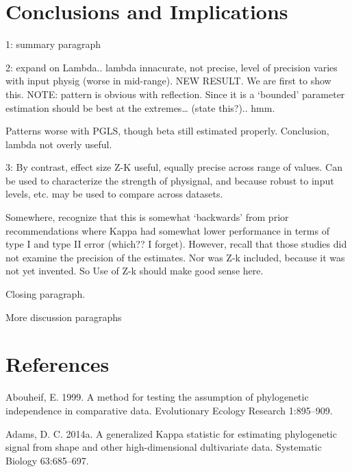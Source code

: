 \documentclass[
]{article}
\begin{document}
\hypertarget{conclusions-and-implications}{%
\section{Conclusions and
Implications}\label{conclusions-and-implications}}

1: summary paragraph

2: expand on Lambda.. lambda innacurate, not precise, level of precision
varies with input physig (worse in mid-range). NEW RESULT. We are first
to show this. NOTE: pattern is obvious with reflection. Since it is a
`bounded' parameter estimation should be best at the extremes\ldots{}
(state this?).. hmm.

Patterns worse with PGLS, though beta still estimated properly.
Conclusion, lambda not overly useful.

3: By contrast, effect size Z-K useful, equally precise across range of
values. Can be used to characterize the strength of physignal, and
because robust to input levels, etc. may be used to compare across
datasets.

Somewhere, recognize that this is somewhat `backwards' from prior
recommendations where Kappa had somewhat lower performance in terms of
type I and type II error (which?? I forget). However, recall that those
studies did not examine the precision of the estimates. Nor was Z-k
included, because it was not yet invented. So Use of Z-k should make
good sense here.

Closing paragraph.

\hfill\break

More discussion paragraphs

\newpage

\hypertarget{references}{%
\section{References}\label{references}}

\setlength{\parindent}{-0.25in} \setlength{\leftskip}{0.25in}
\setlength{\parskip}{8pt} \noindent

\hypertarget{refs}{}
\leavevmode\hypertarget{ref-Abouheif1999}{}%
Abouheif, E. 1999. A method for testing the assumption of phylogenetic
independence in comparative data. Evolutionary Ecology Research
1:895--909.

\leavevmode\hypertarget{ref-Adams2014a}{}%
Adams, D. C. 2014a. A generalized Kappa statistic for estimating
phylogenetic signal from shape and other high-dimensional dultivariate
data. Systematic Biology 63:685--697.
\end{document}
